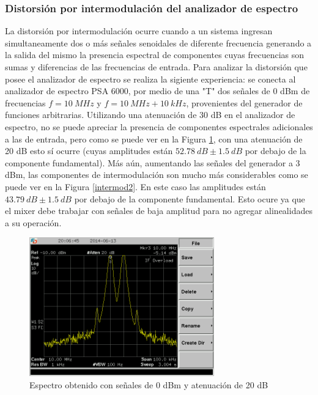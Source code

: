 \documentclass[a4paper,10pt]{article}
\begin{document}
		\subsubsection{Distorsi\'on por intermodulaci\'on del analizador de 
		espectro}
		La distorsi\'on por intermodulaci\'on ocurre cuando a un sistema ingresan simultaneamente dos o m\'as se\~nales senoidales de diferente frecuencia generando a la salida del mismo la presencia espectral de componentes cuyas frecuencias son sumas y diferencias de las frecuencias de entrada.
		Para analizar la distorsi\'on que posee el analizador de espectro se realiza la sigiente experiencia: se conecta al analizador de espectro PSA 6000, por medio de una "T" dos se\~nales de 0 dBm de frecuencias $f=10~MHz$ y $f=10~MHz+10~kHz$, provenientes del generador de funciones arbitrarias. Utilizando una atenuaci\'on de 30 dB en el analizador de espectro, no se puede apreciar la presencia de componentes espectrales adicionales a las de entrada, pero como se puede ver en la Figura \ref{intermod1}, con una atenuaci\'on de 20 dB esto s\'i ocurre (cuyas amplitudes est\'an $52.78~dB\pm1.5~dB$ por debajo de la componente fundamental). M\'as a\'un, aumentando las se\~nales del generador a 3 dBm, las componentes de intermodulaci\'on son mucho m\'as considerables como se puede ver en la Figura \ref{intermod2}. En este caso las amplitudes est\'an $43.79~dB\pm1.5~dB$ por debajo de la componente fundamental. Esto ocure ya que el mixer debe trabajar con se\~nales de baja amplitud para no agregar alinealidades a su operaci\'on. 
		\begin{figure}[!htb]
				\centering
				\includegraphics[width=8cm]
				{Imagenes/SCREN446.png}
				\caption{Espectro obtenido con se\~nales de 0 dBm y atenuaci\'on de 20 dB}
				\label{intermod1} 
		\end{figure}
				
\end{document}
